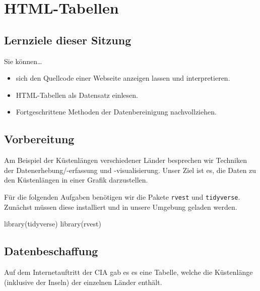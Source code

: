 \documentclass[
  ngerman,
]{article}
\newenvironment{Shaded}{\begin{snugshade}}{\end{snugshade}}
\newcommand{\FunctionTok}[1]{\textcolor[rgb]{0.00,0.00,0.00}{#1}}
\newcommand{\NormalTok}[1]{#1}
\providecommand{\tightlist}{%
  \setlength{\itemsep}{0pt}\setlength{\parskip}{0pt}}
\begin{document}
\hypertarget{html-tabellen}{%
\section{HTML-Tabellen}\label{html-tabellen}}

\hypertarget{lernziele-dieser-sitzung-3}{%
\subsection{Lernziele dieser Sitzung}\label{lernziele-dieser-sitzung-3}}

Sie können\ldots{}

\begin{itemize}
\tightlist
\item
  sich den Quellcode einer Webseite anzeigen lassen und interpretieren.
\item
  HTML-Tabellen als Datensatz einlesen.
\item
  Fortgeschrittene Methoden der Datenbereinigung nachvollziehen.
\end{itemize}

\hypertarget{vorbereitung-2}{%
\subsection{Vorbereitung}\label{vorbereitung-2}}

Am Beispiel der Küstenlängen verschiedener Länder besprechen wir Techniken der Datenerhebung/-erfassung und -visualisierung. Unser Ziel ist es, die Daten zu den Küstenlängen in einer Grafik darzustellen.

Für die folgenden Aufgaben benötigen wir die Pakete \texttt{rvest} und \texttt{tidyverse}. Zunächst müssen diese installiert und in unsere Umgebung geladen werden.

\begin{Shaded}
\begin{Highlighting}[]
\FunctionTok{library}\NormalTok{(tidyverse)}
\FunctionTok{library}\NormalTok{(rvest)}
\end{Highlighting}
\end{Shaded}

\hypertarget{datenbeschaffung}{%
\subsection{Datenbeschaffung}\label{datenbeschaffung}}

Auf dem Internetauftritt der CIA gab es es eine Tabelle, welche die Küstenlänge (inklusive der Inseln) der einzelnen Länder enthält.
\end{document}
